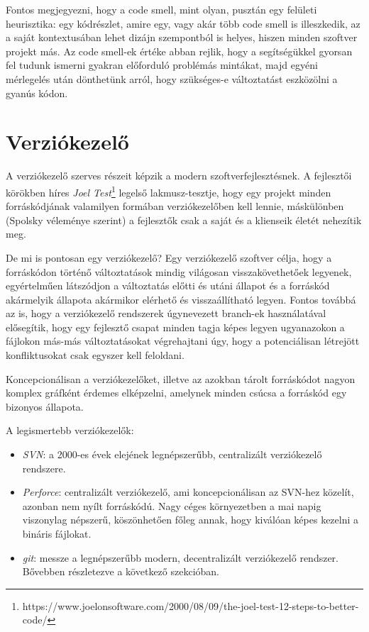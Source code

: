 Fontos megjegyezni, hogy a code smell, mint olyan, pusztán egy felületi heurisztika: egy kódrészlet, amire egy, vagy akár több code smell is illeszkedik, az a saját kontextusában lehet dizájn szempontból is helyes, hiszen minden szoftver projekt más. Az code smell-ek értéke abban rejlik, hogy a segítségükkel gyorsan fel tudunk ismerni gyakran előforduló problémás mintákat, majd egyéni mérlegelés után dönthetünk arról, hogy szükséges-e változtatást eszközölni a gyanús kódon.

\section{Verziókezelő}
\label{section:version_control}

A verziókezelő szerves részeit képzik a modern szoftverfejlesztésnek. A fejlesztői körökben híres \textit{Joel Test}\footnote{https://www.joelonsoftware.com/2000/08/09/the-joel-test-12-steps-to-better-code/} legelső lakmusz-tesztje, hogy egy projekt minden forráskódjának valamilyen formában verziókezelőben kell lennie, máskülönben (Spolsky véleménye szerint) a fejlesztők csak a saját és a klienseik életét nehezítik meg.

De mi is pontosan egy verziókezelő? Egy verziókezelő szoftver célja, hogy a forráskódon történő változtatások mindig világosan visszakövethetőek legyenek, egyértelműen látszódjon a változtatás előtti és utáni állapot és a forráskód akármelyik állapota akármikor elérhető és visszaállítható legyen. Fontos továbbá az is, hogy a verziókezelő rendszerek úgynevezett branch-ek használatával elősegítik, hogy egy fejlesztő csapat minden tagja képes legyen ugyanazokon a fájlokon más-más változtatásokat végrehajtani úgy, hogy a potenciálisan létrejött konfliktusokat csak egyszer kell feloldani.

Koncepcionálisan a verziókezelőket, illetve az azokban tárolt forráskódot nagyon komplex gráfként érdemes elképzelni, amelynek minden csúcsa a forráskód egy bizonyos állapota.

A legismertebb verziókezelők:
\begin{itemize}
    \item \textit{SVN}: a 2000-es évek elejének legnépszerűbb, centralizált verziókezelő rendszere.
    \item \textit{Perforce}: centralizált verziókezelő, ami koncepcionálisan az SVN-hez közelít, azonban nem nyílt forráskódú. Nagy céges környezetben a mai napig viszonylag népszerű, köszönhetően főleg annak, hogy kiválóan képes kezelni a bináris fájlokat.
    \item \textit{git}: messze a legnépszerűbb modern, decentralizált verziókezelő rendszer. Bővebben részletezve a következő szekcióban.
\end{itemize}

